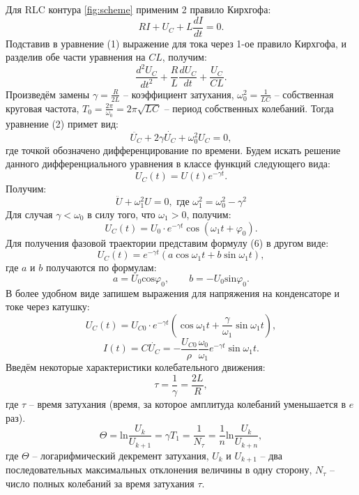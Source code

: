\documentclass[
a4paper, %
12pt, %
]{article}
\begin{document}
	\noindent Для RLC контура \ref{fig:scheme} применим 2 правило Кирхгофа:
	\begin{equation}
		RI + U_C + L\frac{dI}{dt} = 0.
	\end{equation}
	Подставив в уравнение (1) выражение для тока через 1-ое правило Кирхгофа, и разделив обе части уравнения на $CL$, получим:
	\begin{equation}
		\frac{d^2U_C}{dt^2} + \frac{R}{L} \frac{dU_C}{dt} + \frac{U_C}{CL}.
	\end{equation}
	Произведём замены $\gamma = \frac{R}{2L}$ -- коэффициент затухания, $\omega_0^2 = \frac{1}{LC}$ -- собственная круговая частота, $T_0 = \frac{2\pi}{\omega_0} = 2\pi \sqrt{LC}$ -- период собственных колебаний. Тогда уравнение (2) примет вид:
	\begin{equation}
		\ddot{U_C} + 2 \gamma \dot{U_C} + \omega_0^2U_C = 0,
	\end{equation}
	где точкой обозначено дифференцирование по времени. Будем искать решение данного дифференциального уравнения в классе функций следующего вида:
	$$U_C(t) = U(t)e^{- \gamma t}.$$
	Получим:
	\begin{equation}
		\ddot{U} + \omega_1^2 U = 0, \text{	где	} \omega_1^2 = \omega_0^2-\gamma^2
	\end{equation}
	Для случая $\gamma < \omega_0$ в силу того, что $\omega_1 > 0$, получим:
	\begin{equation}
		U_C(t) = U_0 \cdot e^{-\gamma t} \cos{(\omega_1 t + \varphi_0)}.
	\end{equation}
	Для получения фазовой траектории представим формулу (6) в другом виде:
	\begin{equation}
		U_C(t) = e^{-\gamma t}(a \cos{\omega_1 t} + b\sin{\omega_1 t}),
	\end{equation}
	где $a$ и $b$ получаются по формулам:
	$$a = U_0 \text{cos} \varphi_0, \qquad b = - U_0 \text{sin} \varphi_0.$$
	В более удобном виде запишем выражения для напряжения на конденсаторе и токе через катушку:
	\begin{equation}
		U_C (t) = U_{C0} \cdot e^{-\gamma t} (\cos{\omega_1 t + \frac{\gamma}{\omega_1}} \sin{\omega_1 t}),
	\end{equation}
	\begin{equation}
		I(t) = C\dot{U_C}= - \frac{U_{C0}}{\rho} \frac{\omega_0}{\omega_1} e^{-\gamma t} \sin{\omega_1 t}.
	\end{equation}
	Введём некоторые характеристики колебательного движения:
	\begin{equation}
		\tau = \frac{1}{\gamma} = \frac{2L}{R},
	\end{equation}
	где $\tau$ -- время затухания (время, за которое амплитуда колебаний уменьшается в $e$ раз).
	\begin{equation}
		\Theta = \text{ln} \frac{U_k}{U_{k+1}} = \gamma T_1 = \frac{1}{N_\tau} = \frac{1}{n} \text{ln} \frac{U_k}{U_{k+n}}, 
	\end{equation}
	где $\Theta$ -- логарифмический декремент затухания, $U_k$ и $U_{k+1}$ -- два последовательных максимальных отклонения величины в одну сторону, $N_\tau$ -- число полных колебаний за время затухания $\tau$.
	
\end{document}
